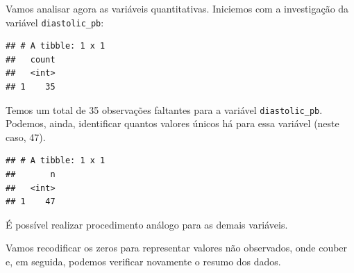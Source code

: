 \documentclass[
]{book}
\newenvironment{Shaded}{\begin{snugshade}}{\end{snugshade}}
\newcommand{\CommentTok}[1]{\textcolor[rgb]{0.56,0.35,0.01}{\textit{#1}}}
\newcommand{\DataTypeTok}[1]{\textcolor[rgb]{0.13,0.29,0.53}{#1}}
\newcommand{\DecValTok}[1]{\textcolor[rgb]{0.00,0.00,0.81}{#1}}
\newcommand{\KeywordTok}[1]{\textcolor[rgb]{0.13,0.29,0.53}{\textbf{#1}}}
\newcommand{\NormalTok}[1]{#1}
\newcommand{\OperatorTok}[1]{\textcolor[rgb]{0.81,0.36,0.00}{\textbf{#1}}}
\newcommand{\StringTok}[1]{\textcolor[rgb]{0.31,0.60,0.02}{#1}}
\theoremstyle{definition}
\theoremstyle{definition}
\theoremstyle{definition}
\theoremstyle{remark}
\begin{document}
Vamos analisar agora as variáveis quantitativas. Iniciemos com a investigação da variável \texttt{diastolic\_pb}:

\begin{Shaded}
\end{Shaded}

\begin{verbatim}
## # A tibble: 1 x 1
##   count
##   <int>
## 1    35
\end{verbatim}

Temos um total de 35 observações faltantes para a variável \texttt{diastolic\_pb}. Podemos, ainda, identificar quantos valores únicos há para essa variável (neste caso, 47).

\begin{Shaded}
\end{Shaded}

\begin{verbatim}
## # A tibble: 1 x 1
##       n
##   <int>
## 1    47
\end{verbatim}

É possível realizar procedimento análogo para as demais variáveis.

Vamos recodificar os zeros para representar valores não observados, onde couber e, em seguida, podemos verificar novamente o resumo dos dados.
\end{document}
